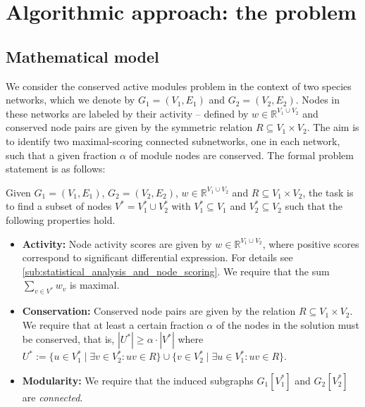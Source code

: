 \section{Algorithmic approach: the \mwccs{} problem}
\label{sec:mip}

	\subsection{Mathematical model}

		We consider the conserved active modules problem in the context of two species networks, which we denote by $G_1 = (V_1, E_1)$ and $G_2 = (V_2, E_2)$.
		Nodes in these networks are labeled by their activity -- defined by $w \in \mathbb{R}^{V_1 \cup V_2}$ and conserved node pairs are given by the symmetric relation $R \subseteq V_1 \times V_2$. The aim is to identify two maximal-scoring connected subnetworks, one in each network, such that a given fraction $\alpha$ of module nodes are conserved.
		The formal problem statement is as follows:

		\begin{problem}
  	  	  Given $G_1=(V_1,E_1)$, $G_2 = (V_2,E_2)$, $w \in \mathbb{R}^{V_1 \cup V_2}$ and $R \subseteq V_1 \times V_2$, the task is to find a subset of nodes $V^* = V^*_1 \cup V^*_2$ with 
		$V^*_1 \subseteq V_1$ and $V^*_2 \subseteq V_2$ such that the following 
		properties hold.
		\begin{itemize}
		\item \textbf{Activity:}
  	  	  Node activity scores are given by $w \in
    	 	 \mathbb{R}^{V_1 \cup V_2}$, where positive scores correspond to
    	 	 significant differential expression. For details see \cref{sub:statistical_analysis_and_node_scoring}.
		We require that the sum $\sum_{v \in V^*} w_v$ is maximal.
		\item \textbf{Conservation:}
  	  	  Conserved node pairs are given by the relation $R
    	 	 \subseteq V_1 \times V_2$. We require that at least a certain fraction $\alpha$ of the nodes in the solution must be
  	  	  conserved, that is, $|U^*| \geq \alpha \cdot |V^*|$ where $U^* := \{u \in V_1^*
  	  	  \mid \exists v \in V_2^*: uv \in R\} \cup \{v \in V_2^*
  	  	  \mid \exists u \in V_1^*: uv \in R\}$.
		\item  \textbf{Modularity:}
  	  	  We require that the induced subgraphs $G_1[V^*_1]$ and $G_2[V^*_2]$ are \emph{connected}.
		\end{itemize}
		\end{problem}

